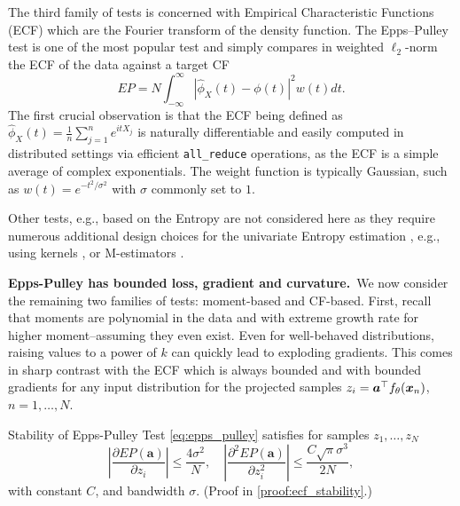 The third family of tests is concerned with Empirical Characteristic Functions (ECF) which are the Fourier transform of the density function. The Epps–Pulley test \citep{epps1983test} is one of the most popular test and simply compares in weighted $\ell_2$-norm the ECF of the data against a target CF
\begin{equation}
    EP = N \int_{-\infty}^{\infty} \left| \hat{\phi}_X(t) - \phi(t) \right|^2 w(t)  dt.\tag{Epps–Pulley}
    \label{eq:epps_pulley}
\end{equation}
The first crucial observation is that the ECF being defined as $\hat{\phi}_X(t) = \frac{1}{n} \sum_{j=1}^{n} e^{itX_j}$ is naturally differentiable and easily computed in distributed settings via efficient {\tt all\_reduce} operations, 
as the ECF is a simple average of complex exponentials. The weight function is typically Gaussian, such as $w(t) = e^{- t^2/\sigma^2}$ with $\sigma$ commonly set to $1$. 






Other tests, e.g., based on the Entropy \citep{szekely2005new} are not considered here as they require numerous additional design choices for the univariate Entropy estimation \citep{silverman2018density,beirlant1997nonparametric}, e.g., using kernels \citep{joe1989estimation}, or M-estimators \citep{miller2003new}.





{\bf Epps-Pulley has bounded loss, gradient and curvature.}~We now consider the remaining two families of tests: moment-based and CF-based. First, recall that moments are polynomial in the data and with extreme growth rate for higher moment--assuming they even exist. Even for well-behaved distributions, raising values to a power of $k$ can quickly lead to exploding gradients. This comes in sharp contrast with the ECF which is always bounded and with bounded gradients for any input distribution for the projected samples $z_i = {\bm{a}}^\top f_\theta({\bm{x}}_n)$, $n=1,\ldots,N$.


\begin{theorem}[label={thm:ecf_stability}]{Stability of Epps-Pulley Test}{}
\eqref{eq:epps_pulley} 
satisfies for samples $z_1,\dots,z_N$
\[
\left|\frac{\partial EP(\mathbf{a})}{\partial z_i}\right| \le \frac{4\sigma^2}{N}, 
\quad
\left|\frac{\partial^2 EP(\mathbf{a})}{\partial z_i^2}\right| \le \frac{C\sqrt{\pi}\sigma^3}{2N},
\]
with constant $C$, and bandwidth $\sigma$. (Proof in \cref{proof:ecf_stability}.)
\end{theorem}

